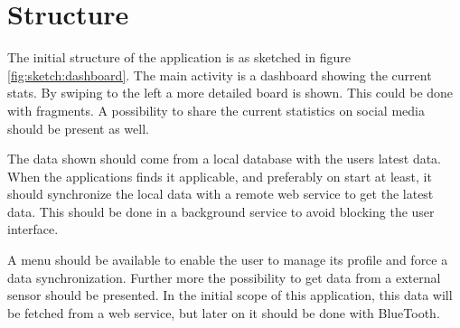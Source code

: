\chapter{Structure}
The initial structure of the application is as sketched in figure \ref{fig:sketch:dashboard}. The main activity is a dashboard showing the current stats. By swiping to the left a more detailed board is shown. This could be done with fragments. A possibility to share the current statistics on social media should be present as well.


The data shown should come from a local database with the users latest data. When the applications finds it applicable, and preferably on start at least, it should synchronize the local data with a remote web service to get the latest data. This should be done in a background service to avoid blocking the user interface.

A menu should be available to enable the user to manage its profile and force a data synchronization. Further more the possibility to get data from a external sensor should be presented. In the initial scope of this application, this data will be fetched from a web service, but later on it should be done with BlueTooth.
